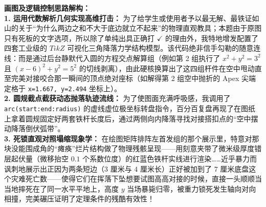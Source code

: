 \begin{center}
\end{center}

\vspace{0.6cm}

{\small\color{blue!70!black}
\textbf{画图及逻辑控制思路解构：}\\
\textbf{1. 运用代数解析几何实现高维打击：} 为了给学生或使用者予以最无解、最铁证如山的关于“为什么两边之和不大于底边就立不起来”的物理直观教具；本题由于原图只有死板的文字选项，所以除了单纯出具正确打 $\checkmark$ 的理由外，我特地增发配置了四套工业级的 $TikZ$ 可视化三角降落力学结构模型。该代码绝非信手勾勒的随意连线：而是通过后台静默代入圆的方程交点解算组（例如第 2 组执行了 $x^2+y^2=3^2$ 且 $(x-6)^2+y^2=5^2$ 的切线剥离），由此硬核换算出了这四组杆件在空中甩动直至完美对接咬合那一瞬间的顶点绝对座标（如解得第 2 组空中抛折的 Apex 尖端定格于 \texttt{x=1.667, y=2.494} 坐标上）。\\
\textbf{2. 圆规截点截获动态抛落轨迹流线：} 为了使图面充满呼吸感，我调用了 \texttt{arc(start:end:radius)} 的虚线虚位极坐标转盘指令，百分百复盘再现了在图纸上拿着圆规固定好两套铁杆长度后，通过两侧向内降落寻找对接搭扣点的“空中摆动降落倒伏弧带”。\\
\textbf{3. 死锁直观对照塌缩现象学：} 在绘图矩阵排阵左首发组的那个展示里，特意对那块没能围成角的“瘫痪”烂片结构做了物理残骸呈现——用刻意夹带了微米级厚度错层起伏量（微移抬空 $0.1$ 个系数位度）的红蓝色铁杆实线进行渲染……近乎暴力而讽刺地展示出正因为两条短边（$3$ 厘米与 $4$ 厘米长）正好被加到了 $7$ 厘米底盘这个灾难死亡数——使得它们在挥落下坠想要试图高高对接的时候，直接一头顺顺当当地摔死在了同一水平平地上，高度 $y$ 当场暴毙归零，被重力锁死发生轴向对向相撞，完美碾压证明了定理条件的残酷有效性！
}

